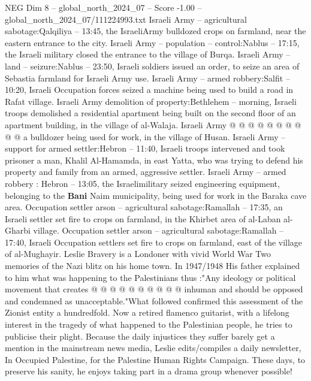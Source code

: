 \begin{textsample}{NEG Dim 8 – global\_north\_2024\_07 – Score -1.00 – global\_north\_2024\_07/111224993.txt}
Israeli Army -- agricultural sabotage:Qalqiliya -- 13:45, the IsraeliArmy bulldozed crops on farmland, near the eastern entrance to the city.
Israeli Army -- population -- control:Nablus -- 17:15, the Israeli military closed the entrance to the village of Burqa.
Israeli Army -- land -- seizure:Nablus -- 23:50, Israeli soldiers issued an order, to seize an area of Sebastia farmland for Israeli Army use.
Israeli Army -- armed robbery:Salfit -- 10:20, Israeli Occupation forces seized a machine being used to build a road in Rafat village.
Israeli Army demolition of property:Bethlehem -- morning, Israeli troops demolished a residential apartment being built on the second floor of an apartment building, in the village of al-Walaja.
Israeli Army @ @ @ @ @ @ @ @ @ @ a bulldozer being used for work, in the village of Husan.
Israeli Army -- support for armed settler:Hebron -- 11:40, Israeli troops intervened and took prisoner a man, Khalil Al-Hamamda, in east Yatta, who was trying to defend his property and family from an armed, aggressive settler.
Israeli Army -- armed robbery : Hebron -- 13:05, the Israelimilitary seized engineering equipment, belonging to the \textbf{Bani} Naim municipality, being used for work in the Baraka cave area.
Occupation settler arson -- agricultural sabotage:Ramallah -- 17:35, an Israeli settler set fire to crops on farmland, in the Khirbet area of al-Laban al-Gharbi village.
Occupation settler arson -- agricultural sabotage:Ramallah -- 17:40, Israeli Occupation settlers set fire to crops on farmland, east of the village of al-Mughayir.
Leslie Bravery is a Londoner with vivid World War Two memories of the Nazi blitz on his home town.
In 1947/1948 His father explained to him what was happening to the Palestinians thus :"Any ideology or political movement that creates @ @ @ @ @ @ @ @ @ @ inhuman and should be opposed and condemned as unacceptable."What followed confirmed this assessment of the Zionist entity a hundredfold.
Now a retired flamenco guitarist, with a lifelong interest in the tragedy of what happened to the Palestinian people, he tries to publicise their plight.
Because the daily injustices they suffer barely get a mention in the mainstream news media, Leslie edits/compiles a daily newsletter, In Occupied Palestine, for the Palestine Human Rights Campaign.
These days, to preserve his sanity, he enjoys taking part in a drama group whenever possible!

\end{textsample}
